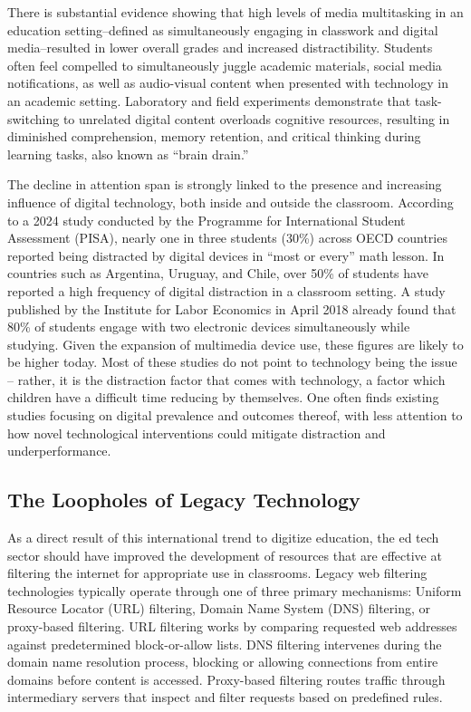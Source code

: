 \documentclass[
  titlepage]{article}
\begin{document}
There is substantial evidence showing that high levels of media
multitasking in an education setting--defined as simultaneously engaging
in classwork and digital media--resulted in lower overall grades and
increased distractibility. Students often feel compelled to
simultaneously juggle academic materials, social media notifications, as
well as audio-visual content when presented with technology in an
academic setting. Laboratory and field experiments demonstrate that
task-switching to unrelated digital content overloads cognitive
resources, resulting in diminished comprehension, memory retention, and
critical thinking during learning tasks, also known as ``brain drain.''

The decline in attention span is strongly linked to the presence and
increasing influence of digital technology, both inside and outside the
classroom. According to a 2024 study conducted by the Programme for
International Student Assessment (PISA), nearly one in three students
(30\%) across OECD countries reported being distracted by digital
devices in ``most or every'' math lesson. In countries such as
Argentina, Uruguay, and Chile, over 50\% of students have reported a
high frequency of digital distraction in a classroom setting. A study
published by the Institute for Labor Economics in April 2018 already
found that 80\% of students engage with two electronic devices
simultaneously while studying. Given the expansion of multimedia device
use, these figures are likely to be higher today. Most of these studies
do not point to technology being the issue -- rather, it is the
distraction factor that comes with technology, a factor which children
have a difficult time reducing by themselves. One often finds existing
studies focusing on digital prevalence and outcomes thereof, with less
attention to how novel technological interventions could mitigate
distraction and underperformance.

\subsection{The Loopholes of Legacy
Technology}\label{the-loopholes-of-legacy-technology}

As a direct result of this international trend to digitize education,
the ed tech sector should have improved the development of resources
that are effective at filtering the internet for appropriate use in
classrooms. Legacy web filtering technologies typically operate through
one of three primary mechanisms: Uniform Resource Locator (URL)
filtering, Domain Name System (DNS) filtering, or proxy-based filtering.
URL filtering works by comparing requested web addresses against
predetermined block-or-allow lists. DNS filtering intervenes during the
domain name resolution process, blocking or allowing connections from
entire domains before content is accessed. Proxy-based filtering routes
traffic through intermediary servers that inspect and filter requests
based on predefined rules.
\end{document}
